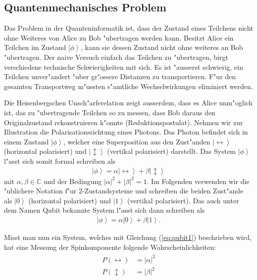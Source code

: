 \begin{refsection}
\subsection{Quantenmechanisches Problem}
Das Problem in der Quanteninformatik ist, dass der Zustand eines Teilchens nicht ohne Weiteres von Alice zu Bob "ubertragen werden kann. Besitzt Alice ein Teilchen im Zustand $\left|\phi\right\rangle$, kann sie dessen Zustand nicht ohne weiteres an Bob "ubertragen. Der naive Versuch einfach das Teilchen zu "ubertragen, birgt verschiedene technische Schwierigkeiten mit sich. Es ist "ausserst schwierig, ein Teilchen unver"andert "uber gr"ossere Distanzen zu transportieren. F"ur den gesamten Transportweg m"ussten s"amtliche Wechselwirkungen eliminiert werden. 

Die Heisenbergschen Unsch"arferelation zeigt ausserdem, dass es Alice unm"oglich ist, das zu "ubertragende Teilchen so zu messen, dass Bob daraus den Originalzustand rekonstruieren k"onnte (Reduktionspostulat). Nehmen wir zur Illustration die Polarisationsrichtung eines Photons. Das Photon befindet sich in einem Zustand $\left|\phi\right\rangle$, welcher eine Superposition aus den Zust"anden $\left|\leftrightarrow\right\rangle$ (horizontal polarisiert) und $\left|\updownarrow\right\rangle$ (vertikal polarisiert) darstellt. Das System $\left|\phi\right\rangle$ l"asst sich somit formal schreiben als
\begin{align}\label{eq:qubit1}
\left|\phi\right\rangle = \alpha\left|\leftrightarrow\right\rangle + \beta\left|\updownarrow\right\rangle 
\end{align}
mit $\alpha, \beta \in \mathbb{C}$ und der Bedingung $\left|\alpha\right|^{2} + \left|\beta\right|^{2} = 1$. Im Folgenden verwenden wir die "ublichere Notation f"ur 2-Zustandsysteme und schreiben die beiden Zust"ande als $\left| 0 \right\rangle$ (horizontal polarisiert) und $\left| 1 \right\rangle$ (vertikal polarisiert). Das auch unter dem Namen Qubit bekannte System l"asst sich dann schreiben als 
\begin{align}\label{eq:qubit2}
\left|\phi\right\rangle = \alpha\left|0\right\rangle + \beta\left|1\right\rangle.
\end{align}

Misst man nun ein System, welches mit Gleichung (\ref{eq:qubit1}) beschrieben wird, hat eine Messung der Spinkomponente folgende Wahrscheinlichkeiten:
\begin{align}
	\begin{split}
		P\left(\leftrightarrow\right) & =\left|\alpha\right|^2  \\
	    P\left(\updownarrow\right) & =\left|\beta\right|^2
	\end{split}
\end{align}


\end{refsection}
